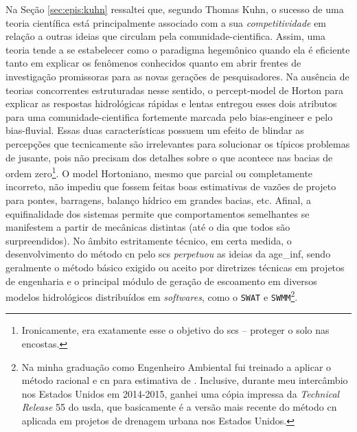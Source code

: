 \documentclass[./main.tex]{subfiles}
\begin{document}
\par Na Seção \ref{sec:epis:kuhn} ressaltei que, segundo Thomas Kuhn, o sucesso de uma \gls{teoria} científica está principalmente associado com a sua \textit{competitividade} em relação a outras ideias que circulam pela \gls{comunidade-cientifica}. Assim, uma \gls{teoria} tende a se estabelecer como o \gls{paradigma} hegemônico quando ela é eficiente tanto em explicar os fenômenos conhecidos quanto em abrir frentes de investigação promissoras para as novas gerações de pesquisadores. Na ausência de teorias concorrentes estruturadas nesse sentido, o \gls{percept-model} de Horton para explicar as respostas hidrológicas rápidas e lentas entregou esses dois atributos para uma \gls{comunidade-cientifica} fortemente marcada pelo \gls{bias-engineer} e pelo \gls{bias-fluvial}. Essas duas características possuem um efeito de blindar as percepções que tecnicamente são irrelevantes para solucionar os típicos problemas de jusante, pois não precisam dos detalhes sobre o que acontece nas bacias de ordem zero\footnote{Ironicamente, era exatamente esse o objetivo do \acrshort{scs} -- proteger o solo nas encostas.}. O \gls{model} Hortoniano, mesmo que parcial ou completamente incorreto, não impediu que fossem feitas boas estimativas de vazões de projeto para pontes, barragens, balanço hídrico em grandes bacias, etc. Afinal, a equifinalidade dos sistemas permite que comportamentos semelhantes se manifestem a partir de mecânicas distintas (até o dia que todos são surpreendidos). No âmbito estritamente técnico, em certa medida, o desenvolvimento do método \acrshort{cn} pelo \acrshort{scs} \textit{perpetuou} as ideias da \gls{age_inf}, sendo geralmente o método básico exigido ou aceito por diretrizes técnicas em projetos de engenharia e o principal módulo de geração de escoamento em diversos modelos hidrológicos distribuídos em \textit{softwares}, como o \texttt{SWAT} e \texttt{SWMM}\footnote{Na minha graduação como Engenheiro Ambiental fui treinado a aplicar o método racional e \acrshort{cn} para estimativa de . Inclusive, durante meu intercâmbio nos Estados Unidos em 2014-2015, ganhei uma cópia impressa da \textit{Technical Release} 55 do \acrshort{usda}, que basicamente é a versão mais recente do método \acrshort{cn} aplicada em projetos de drenagem urbana nos Estados Unidos.}. 
\end{document}
